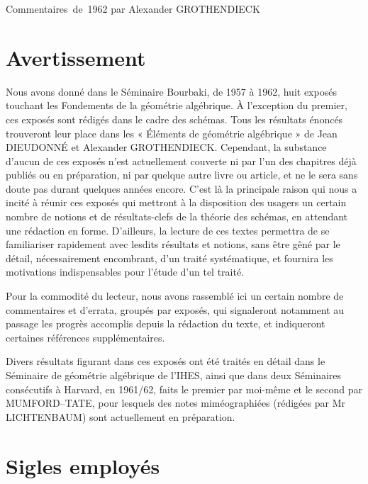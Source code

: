 \unit{Commentaires de 1962}
%
  {par Alexander GROTHENDIECK}

\section*{Avertissement}

Nous avons donné dans le Séminaire Bourbaki, de 1957 à 1962, huit exposés
touchant les Fondements de la géométrie algébrique. À l'exception du premier,
ces exposés sont rédigés dans le cadre des schémas. Tous les résultats énoncés
trouveront leur place dans les « Éléments de géométrie algébrique » de Jean
DIEUDONNÉ et Alexander GROTHENDIECK. Cependant, la substance d'aucun de ces
exposés n'est actuellement couverte ni par l'un des chapitres déjà publiés ou
en préparation, ni par quelque autre livre ou article, et ne le sera sans doute
pas durant quelques années encore. C'est là la principale raison qui nous a
incité à réunir ces exposés qui mettront à la disposition des usagers un certain
nombre de notions et de résultats-clefs de la théorie des schémas, en attendant
une rédaction en forme. D'ailleurs, la lecture de ces textes permettra de se
familiariser rapidement avec lesdits résultats et notions, sans être gêné par
le détail, nécessairement encombrant, d'un traité systématique, et fournira les
motivations indispensables pour l'étude d'un tel traité.

Pour la commodité du lecteur, nous avons rassemblé ici un certain nombre de
commentaires et d'errata, groupés par exposés, qui signaleront notamment au
passage les progrès accomplis depuis la rédaction du texte, et indiqueront
certaines références supplémentaires.

Divers résultats figurant dans ces exposés ont été traités en détail dans le
Séminaire de géométrie algébrique de l'IHES, ainsi que dans deux Séminaires
consécutifs à Harvard, en 1961/62, faits le premier par moi-même et le second
par MUMFORD--TATE, pour lesquels des notes miméographiées (rédigées par Mr
LICHTENBAUM) sont actuellement en préparation.

\section*{Sigles employés}

